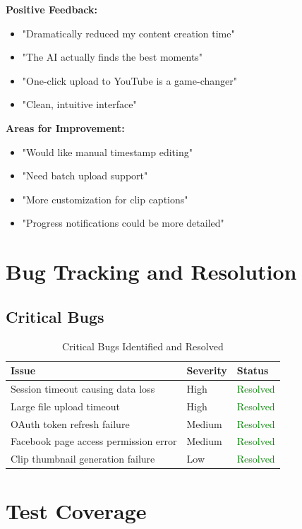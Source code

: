 \textbf{Positive Feedback:}
\begin{itemize}
    \item "Dramatically reduced my content creation time"
    \item "The AI actually finds the best moments"
    \item "One-click upload to YouTube is a game-changer"
    \item "Clean, intuitive interface"
\end{itemize}

\textbf{Areas for Improvement:}
\begin{itemize}
    \item "Would like manual timestamp editing"
    \item "Need batch upload support"
    \item "More customization for clip captions"
    \item "Progress notifications could be more detailed"
\end{itemize}

\section{Bug Tracking and Resolution}

\subsection{Critical Bugs}

\begin{table}[H]
\centering
\caption{Critical Bugs Identified and Resolved}
\begin{tabular}{@{}p{5cm}ll@{}}
\toprule
\textbf{Issue} & \textbf{Severity} & \textbf{Status} \\
\midrule
Session timeout causing data loss & High & \textcolor{green}{Resolved} \\
Large file upload timeout & High & \textcolor{green}{Resolved} \\
OAuth token refresh failure & Medium & \textcolor{green}{Resolved} \\
Facebook page access permission error & Medium & \textcolor{green}{Resolved} \\
Clip thumbnail generation failure & Low & \textcolor{green}{Resolved} \\
\bottomrule
\end{tabular}
\end{table}

\section{Test Coverage}

